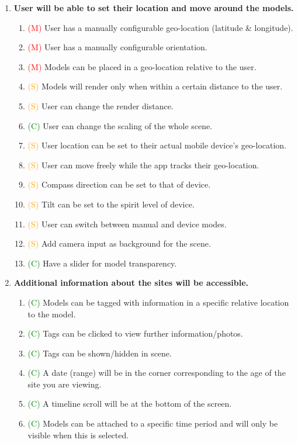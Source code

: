 \documentclass[12pt, a4paper]{article}
\newcommand{\must}[1]{\textcolor{red}{#1}}
\newcommand{\should}[1]{\textcolor{orange}{#1}}
\newcommand{\could}[1]{\textcolor{green}{#1}}
\begin{document}
\begin{enumerate}[label=\Roman*.]
\item \textbf{User will be able to set their location and move around the models.}
    \begin{enumerate}[label=\arabic*.]
    \item \must{(M)} User has a manually configurable geo-location (latitude \& longitude).
    \item \must{(M)} User has a manually configurable orientation.
    \item \must{(M)} Models can be placed in a geo-location relative to the user.
    \item \should{(S)} Models will render only when within a certain distance to the user.
    \item \should{(S)} User can change the render distance.
    \item \could{(C)} User can change the scaling of the whole scene.
    \item \should{(S)} User location can be set to their actual mobile device's geo-location.
    \item \should{(S)} User can move freely while the app tracks their geo-location.
    \item \should{(S)} Compass direction can be set to that of device.
    \item \should{(S)} Tilt can be set to the spirit level of device.
    \item \should{(S)} User can switch between manual and device modes.
    \item \should{(S)} Add camera input as background for the scene.
    \item \could{(C)} Have a slider for model transparency.
    \end{enumerate}
    
\item \textbf{Additional information about the sites will be accessible.}
    \begin{enumerate}[label=\arabic*.]
    \item \could{(C)} Models can be tagged with information in a specific relative location to the model.
    \item \could{(C)} Tags can be clicked to view further information/photos.
    \item \could{(C)} Tags can be shown/hidden in scene.
    \item \could{(C)} A date (range) will be in the corner corresponding to the age of the site you are viewing.
    \item \could{(C)} A timeline scroll will be at the bottom of the screen.
    \item \could{(C)} Models can be attached to a specific time period and will only be visible when this is selected.
    \end{enumerate}


\end{enumerate}
\end{document}
